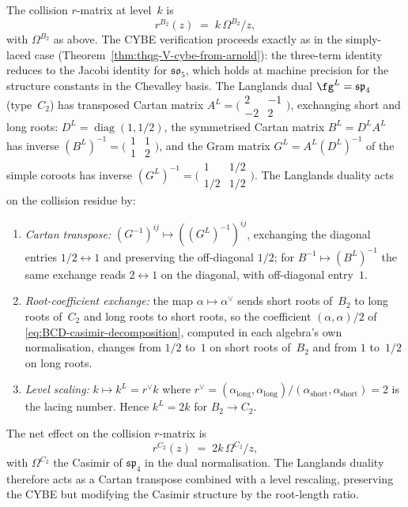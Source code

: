 \begin{computation}
The collision $r$-matrix at level~$k$ is
\begin{equation}\label{eq:B2-r-matrix}
 r^{B_2}(z) \;=\; k\,\Omega^{B_2}/z,
\end{equation}
with $\Omega^{B_2}$ as above. The CYBE verification proceeds
exactly as in the simply-laced case
(Theorem~\ref{thm:thqg-V-cybe-from-arnold}): the three-term identity
reduces to the Jacobi identity for $\mathfrak{so}_5$, which
holds at machine precision for the structure constants
in the Chevalley basis.
The Langlands dual $\fg^L = \mathfrak{sp}_4$ (type~$C_2$)
has transposed Cartan matrix
$A^L = \bigl(\begin{smallmatrix} 2 & -1 \\ -2 & 2
\end{smallmatrix}\bigr)$,
exchanging short and long roots: $D^L = \operatorname{diag}(1, 1/2)$,
the symmetrised Cartan matrix $B^L = D^L A^L$ has inverse
$(B^L)^{-1} = \bigl(\begin{smallmatrix} 1 & 1 \\
1 & 2 \end{smallmatrix}\bigr)$, and the Gram matrix
$G^L = A^L (D^L)^{-1}$ of the simple coroots has inverse
$(G^L)^{-1} = \bigl(\begin{smallmatrix} 1 & 1/2 \\
1/2 & 1/2 \end{smallmatrix}\bigr)$.
The Langlands duality acts on the collision residue by:
\begin{enumerate}[label=\textup{(\roman*)}]
\item \emph{Cartan transpose:} $(G^{-1})^{ij} \mapsto
 ((G^L)^{-1})^{ij}$, exchanging the diagonal entries
 $1/2 \leftrightarrow 1$ and preserving the off-diagonal
 $1/2$; for $B^{-1} \mapsto (B^L)^{-1}$ the same exchange
 reads $2 \leftrightarrow 1$ on the diagonal, with
 off-diagonal entry~$1$.
\item \emph{Root-coefficient exchange:} the map
 $\alpha \mapsto \alpha^\vee$ sends short roots of~$B_2$ to
 long roots of~$C_2$ and long roots to short roots, so the
 coefficient $(\alpha,\alpha)/2$ of
 \eqref{eq:BCD-casimir-decomposition}, computed in each
 algebra's own normalisation, changes from $1/2$ to~$1$ on
 short roots of~$B_2$ and from $1$ to~$1/2$ on long roots.
\item \emph{Level scaling:} $k \mapsto k^L = r^\vee k$
 where $r^\vee = (\alpha_{\mathrm{long}},
 \alpha_{\mathrm{long}})/(\alpha_{\mathrm{short}},
 \alpha_{\mathrm{short}}) = 2$ is the lacing number.
 Hence $k^L = 2k$ for $B_2 \to C_2$.
\end{enumerate}
The net effect on the collision $r$-matrix is
\begin{equation}\label{eq:langlands-r-matrix}
 r^{C_2}(z)
 \;=\;
 2k\,\Omega^{C_2}/z,
\end{equation}
with $\Omega^{C_2}$ the Casimir of $\mathfrak{sp}_4$ in
the dual normalisation. The Langlands duality therefore
acts as a Cartan transpose combined with a level rescaling,
preserving the CYBE but modifying the Casimir structure
by the root-length ratio.


\end{computation}

